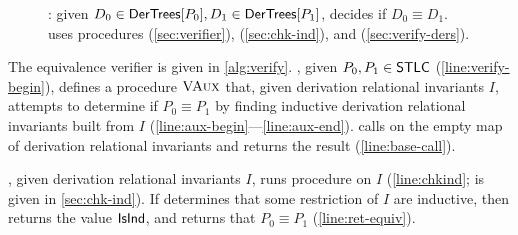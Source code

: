 \begin{figure}
\begin{minipage}{0.48\linewidth}
\begin{algorithm}[H]
  {  %
  } %
  \caption{%
    \verifyders: given $D_0 \in \mathsf{DerTrees}[ P_0 ], D_1 \in
    \mathsf{DerTrees}[ P_1 ]$, decides if $D_0 \equiv D_1$.
    \verify uses procedures \mergeinvs (\autoref{sec:verifier}), %
    \chkinductive (\autoref{sec:chk-ind}), and %
    \verifyders (\autoref{sec:verify-ders}).
  }
  \label{alg:verify-ders}
\end{algorithm}
  \end{minipage}
\end{figure}

The equivalence verifier \verify is given in \autoref{alg:verify}.
%
\verify, given $P_0, P_1 \in \mathsf{STLC}$ (\autoref{line:verify-begin}),
defines a procedure $\textsc{VAux}$ that, given derivation relational
invariants $I$, attempts to determine if $P_0 \equiv P_1$ by finding
inductive derivation relational invariants built from $I$
(\autoref{line:aux-begin}---\autoref{line:aux-end}).
%
\verify calls \verifyaux on the empty map of derivation relational
invariants and returns the result (\autoref{line:base-call}).

\verifyaux, given derivation relational invariants $I$, runs procedure
\chkinductive on $I$ (\autoref{line:chkind}; \chkinductive is given in
\autoref{sec:chk-ind}).
%
If \chkinductive determines that some restriction of $I$ are
inductive, then \chkinductive returns the value $\mathsf{IsInd}$, and
\verifyaux returns that $P_0 \equiv P_1$ (\autoref{line:ret-equiv}).

